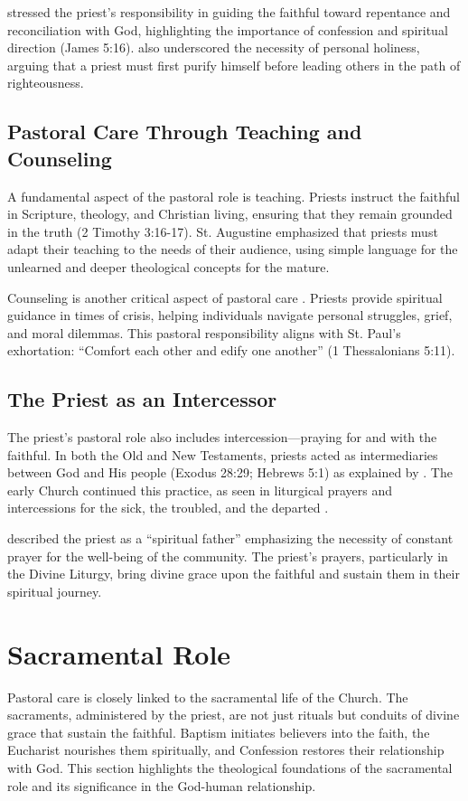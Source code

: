\documentclass[12pt,doc]{apa7}   	%
\begin{document}
\citet{priesthood_shenouda} stressed the priest’s responsibility in guiding the faithful toward repentance and reconciliation with God, highlighting the importance of confession and spiritual direction (James 5:16). \citet{st_basil_letters} also underscored the necessity of personal holiness, arguing that a priest must first purify himself before leading others in the path of righteousness.

\subsection{Pastoral Care Through Teaching and Counseling}

A fundamental aspect of the pastoral role is teaching. Priests instruct the faithful in Scripture, theology, and Christian living, ensuring that they remain grounded in the truth (2 Timothy 3:16-17). St. Augustine \citep{early_church_akin} emphasized that priests must adapt their teaching to the needs of their audience, using simple language for the unlearned and deeper theological concepts for the mature.

Counseling is another critical aspect of pastoral care \citep{hgb-youssef_pastoral_epsitles}. Priests provide spiritual guidance in times of crisis, helping individuals navigate personal struggles, grief, and moral dilemmas. This pastoral responsibility aligns with St. Paul’s exhortation: ``Comfort each other and edify one another'' (1 Thessalonians 5:11).

\subsection{The Priest as an Intercessor}

The priest’s pastoral role also includes intercession—praying for and with the faithful. In both the Old and New Testaments, priests acted as intermediaries between God and His people (Exodus 28:29; Hebrews 5:1) as explained by \citet{hgb-youssef_hebrews}. The early Church continued this practice, as seen in liturgical prayers and intercessions for the sick, the troubled, and the departed \citep{holmes_apostolic_fathers}.

\citet{priests_zacharias} described the priest as a ``spiritual father'' emphasizing the necessity of constant prayer for the well-being of the community. The priest’s prayers, particularly in the Divine Liturgy, bring divine grace upon the faithful and sustain them in their spiritual journey.

\section{Sacramental Role}\label{sacramental}
Pastoral care is closely linked to the sacramental life of the Church. The sacraments, administered by the priest, are not just rituals but conduits of divine grace that sustain the faithful. Baptism initiates believers into the faith, the Eucharist nourishes them spiritually, and Confession restores their relationship with God. This section highlights the theological foundations of the sacramental role and its significance in the God-human relationship.
\end{document}
